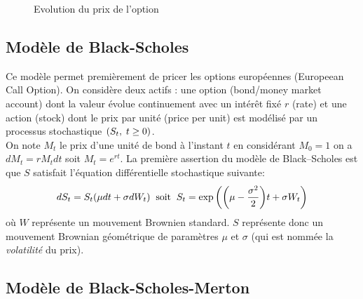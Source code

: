 \documentclass[a4paper]{article}
\begin{document}
\begin{figure}[H]
\caption{Evolution du prix de l'option}
\end{figure} 

\subsection{Modèle de Black-Scholes}
Ce modèle permet premièrement de pricer les options européennes (Europeean Call Option). On considère deux actifs : une option (bond/money market account) dont la valeur évolue continuement avec un intérêt fixé $r$ (rate) et une action (stock) dont le prix par unité (price per unit) est modélisé par un processus stochastique $(S_t, \hspace{1mm} t\geq 0)$.\\
On note $M_t$ le prix d'une unité de bond à l'instant $t$ en considérant $M_0=1$ on a $dM_t = rM_tdt$ soit $M_t= e^{rt}$. La première assertion du modèle de Black--Scholes est que $S$ satisfait l'équation différentielle stochastique suivante:
\begin{equation}
dS_t = S_t(\mu dt + \sigma dW_t)\hspace{2mm}\text{soit}\hspace{2mm}S_t=\exp{\bigg(\bigg(\mu - \frac{\sigma^2}{2}\bigg)t + \sigma W_t\bigg)}
\end{equation}
où $W$ représente un mouvement Brownien standard. $S$ représente donc un mouvement Brownian géométrique de paramètres $\mu$ et $\sigma$ (qui est nommée la \textit{volatilité} du prix).
\subsection{Modèle de Black-Scholes-Merton}
\end{document}
